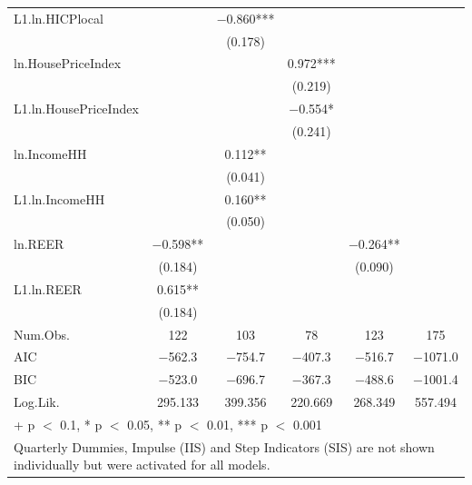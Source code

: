 \begin{table}
{\begin{tabular}[t]{lccccc}
L1.ln.HICPlocal &  & \num{-0.860}*** &  &  & \\
 &  & (\num{0.178}) &  &  & \\
ln.HousePriceIndex &  &  & \num{0.972}*** &  & \\
 &  &  & (\num{0.219}) &  & \\
L1.ln.HousePriceIndex &  &  & \num{-0.554}* &  & \\
 &  &  & (\num{0.241}) &  & \\
ln.IncomeHH &  & \num{0.112}** &  &  & \\
 &  & (\num{0.041}) &  &  & \\
L1.ln.IncomeHH &  & \num{0.160}** &  &  & \\
 &  & (\num{0.050}) &  &  & \\
ln.REER & \num{-0.598}** &  &  & \num{-0.264}** & \\
 & (\num{0.184}) &  &  & (\num{0.090}) & \\
L1.ln.REER & \num{0.615}** &  &  &  & \\
 & (\num{0.184}) &  &  &  & \\
\midrule
Num.Obs. & \num{122} & \num{103} & \num{78} & \num{123} & \num{175}\\
AIC & \num{-562.3} & \num{-754.7} & \num{-407.3} & \num{-516.7} & \num{-1071.0}\\
BIC & \num{-523.0} & \num{-696.7} & \num{-367.3} & \num{-488.6} & \num{-1001.4}\\
Log.Lik. & \num{295.133} & \num{399.356} & \num{220.669} & \num{268.349} & \num{557.494}\\
\bottomrule
\multicolumn{6}{l}{\rule{0pt}{1em}+ p $<$ 0.1, * p $<$ 0.05, ** p $<$ 0.01, *** p $<$ 0.001}\\
\multicolumn{6}{l}{\rule{0pt}{1em}Quarterly Dummies, Impulse (IIS) and Step Indicators (SIS) are not shown individually but were activated for all models.}\\
\end{tabular}}
\end{table}
